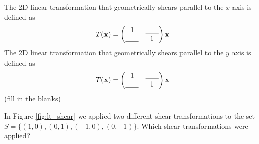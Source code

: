 \begin{definition}
    The 2D linear transformation that geometrically shears parallel to the $x$ axis is
    defined as
    \[ T({\bf x}) = \begin{pmatrix} 1 & \underline{\hspace{0.25in}} \\
        \underline{\hspace{0.25in}} & 1 \end{pmatrix} {\bf x} \]
    The 2D linear transformation that geometrically shears parallel to the $y$ axis is
    defined as
    \[ T({\bf x}) = \begin{pmatrix} 1 & \underline{\hspace{0.25in}} \\
        \underline{\hspace{0.25in}} & 1 \end{pmatrix} {\bf x} \]
    (fill in the blanks)
\end{definition}

\begin{problem}
In Figure \ref{fig:lt_shear} we applied two different shear transformations to the set $S
= \{(1,0),(0,1),(-1,0),(0,-1)\}$.  Which shear transformations were applied?
\end{problem}

